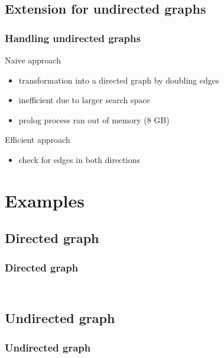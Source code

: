 \documentclass{beamer}
\begin{document}
	\subsection{Extension for undirected graphs}
	\begin{frame}
		\frametitle{Handling undirected graphs}
		\begin{block}{Naive approach}
			\begin{itemize}
				\item transformation into a directed graph by doubling edges
				\item inefficient due to larger search space
				\item prolog process ran out of memory (8 GB)
			\end{itemize}
		\end{block}
		\begin{block}{Efficient approach}
			\begin{itemize}
				\item check for edges in both directions 
			\end{itemize}
		\end{block}
	\end{frame}
	
	\section{Examples}
	\subsection{Directed graph}
	\begin{frame}
		\frametitle{Directed graph}
		\begin{columns}
			\begin{column}{0.3 \linewidth}
				\begin{figure}
				\end{figure}
			\end{column}
			\begin{column}{0.7 \linewidth}
				\begin{example}
				\end{example}
			\end{column}
		\end{columns}
	\end{frame}
	
	\subsection{Undirected graph}
	\begin{frame}
		\frametitle{Undirected graph}
		\begin{columns}
			\begin{column}{0.3 \linewidth}
				\begin{figure}
				\end{figure}
			\end{column}
			\begin{column}{0.7 \linewidth}
				\begin{example}
				\end{example}
			\end{column}
		\end{columns}
	\end{frame}
	
\end{document}
